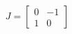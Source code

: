 \documentclass[preview]{standalone}
\begin{document}
\begin{align*}
J=\begin{bmatrix}0&-1\\1&0\end{bmatrix}
\end{align*}
\end{document}
